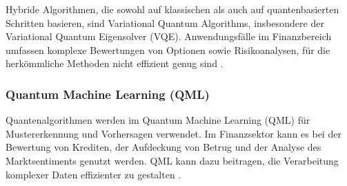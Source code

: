 Hybride Algorithmen, die sowohl auf klassischen als auch auf quantenbasierten Schritten basieren, sind Variational Quantum Algorithms, insbesondere der Variational Quantum Eigensolver (VQE). Anwendungsfälle im Finanzbereich umfassen komplexe Bewertungen von Optionen sowie Risikoanalysen, für die herkömmliche Methoden nicht effizient genug sind \cite{bouland2020,martin2022}.

\subsubsection{Quantum Machine Learning (QML)}

Quantenalgorithmen werden im Quantum Machine Learning (QML) für Mustererkennung und Vorhersagen verwendet. Im Finanzsektor kann es bei der Bewertung von Krediten, der Aufdeckung von Betrug und der Analyse des Marktsentiments genutzt werden. QML kann dazu beitragen, die Verarbeitung komplexer Daten effizienter zu gestalten \cite{bouland2020,martin2022}.



